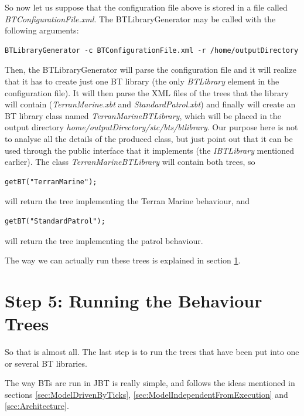 \documentclass[a4paper]{article}
\begin{document}
So now let us suppose that the configuration file above is stored in a file called \textit{BTConfigurationFile.xml}. The BTLibraryGenerator may be called with the following arguments:

\begin{verbatim}
BTLibraryGenerator -c BTConfigurationFile.xml -r /home/outputDirectory
\end{verbatim}

Then, the BTLibraryGenerator will parse the configuration file and it will realize that it has to create just one BT library (the only \textit{BTLibrary} element in the configuration file). It will then parse the XML files of the trees that the library will contain (\textit{TerranMarine.xbt} and \textit{StandardPatrol.xbt}) and finally will create an BT library class named \textit{TerranMarineBTLibrary}, which will be placed in the output directory \textit{home/outputDirectory/stc/bts/btlibrary}. Our purpose here is not to analyse all the details of the produced class, but just point out that it can be used through the public interface that it implements (the \textit{IBTLibrary} mentioned earlier). The class \textit{TerranMarineBTLibrary} will contain both trees, so

\begin{verbatim}
getBT("TerranMarine");
\end{verbatim}

will return the tree implementing the Terran Marine behaviour, and

\begin{verbatim}
getBT("StandardPatrol");
\end{verbatim}

will return the tree implementing the patrol behaviour.

The way we can actually run these trees is explained in section \ref{sec:RunningTheBehaviourTrees}.

\section{Step 5: Running the Behaviour Trees}\label{sec:RunningTheBehaviourTrees}

So that is almost all. The last step is to run the trees that have been put into one or several BT libraries.

The way BTs are run in JBT is really simple, and follows the ideas mentioned in sections \ref{sec:ModelDrivenByTicks}, \ref{sec:ModelIndependentFromExecution} and \ref{sec:Architecture}.
\end{document}
